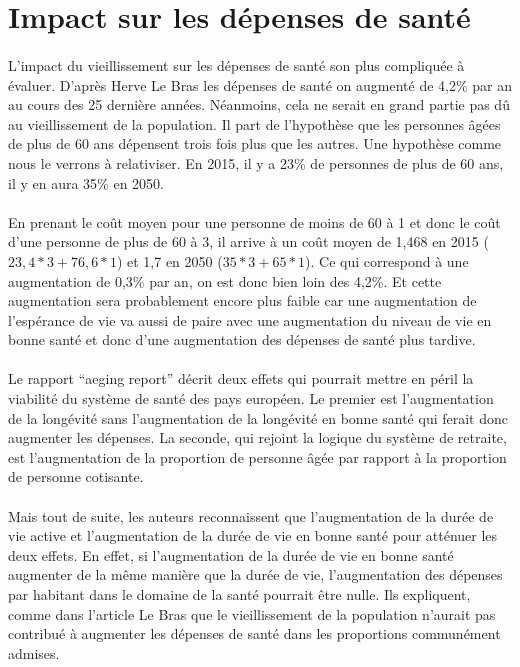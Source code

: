 \section{Impact sur les dépenses de santé}
\paragraph{}L’impact du vieillissement sur les dépenses de santé son plus compliquée à évaluer. D’après Herve Le Bras\citep[pp.31]{heran} les dépenses de santé on augmenté de 4,2\% par an au cours des 25 dernière années. Néanmoins, cela ne serait en grand partie pas dû au vieillissement de la population.  Il part de l’hypothèse que les personnes âgées de plus de 60 ans dépensent trois fois plus que les autres. Une hypothèse comme nous le verrons à relativiser. En 2015, il y a 23\% de personnes de plus de 60 ans, il y en aura 35\% en 2050.


\paragraph{}En prenant le coût moyen pour une personne de moins de 60 à 1 et donc le coût d’une personne de plus de 60 à 3, il arrive à un coût moyen de 1,468 en 2015 ($23,4 * 3 + 76,6 * 1$) et 1,7 en 2050 ($35 * 3 + 65 *1$). Ce qui correspond à une augmentation de 0,3\% par an, on est donc bien loin des 4,2\%. Et cette augmentation sera probablement encore plus faible car une augmentation de l’espérance de vie va aussi de paire avec une augmentation du niveau de vie en bonne santé et donc d’une augmentation des dépenses de santé plus tardive. 

\paragraph{}Le rapport “aeging report”\citep{ageing} décrit deux effets qui pourrait mettre en péril la viabilité du système de santé des pays européen. Le premier est l’augmentation de la longévité sans l’augmentation de la longévité en bonne santé qui ferait donc augmenter les dépenses. La seconde, qui rejoint la logique du système de retraite, est l’augmentation de la proportion de personne âgée par rapport à la proportion de personne cotisante\citep[pp.116]{ageing}.   

\paragraph{}Mais tout de suite, les auteurs reconnaissent que l’augmentation de la durée de vie active et l’augmentation de la durée de vie en bonne santé pour atténuer les deux effets. En effet, si l’augmentation de la durée de vie en bonne santé augmenter de la même manière que la durée de vie, l’augmentation des dépenses par habitant dans le domaine de la santé pourrait être nulle.  Ils expliquent, comme dans l’article Le Bras que le vieillissement de la population n’aurait pas contribué à augmenter les dépenses de santé dans les proportions communément admises.\citep[pp.116]{ageing} 

